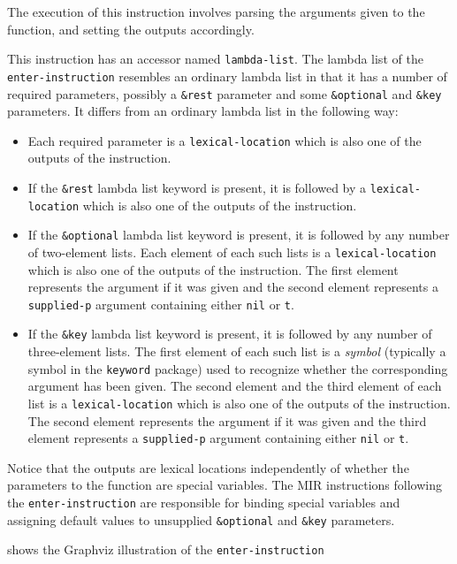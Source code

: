 The execution of this instruction involves parsing the arguments given
to the function, and setting the outputs accordingly.  

This instruction has an accessor named \texttt{lambda-list}.  The
lambda list of the \texttt{enter-instruction} resembles an ordinary
lambda list in that it has a number of required parameters, possibly a
\texttt{\&rest} parameter and some \texttt{\&optional} and
\texttt{\&key} parameters.  It differs from an ordinary lambda list in
the following way:

\begin{itemize}
\item Each required parameter is a \texttt{lexical-location} which is
  also one of the outputs of the instruction.
\item If the \texttt{\&rest} lambda list keyword is present, it is
  followed by a \texttt{lexical-location} which is also one of the
  outputs of the instruction.
\item If the \texttt{\&optional} lambda list keyword is present, it is
  followed by any number of two-element lists.  Each element of each
  such lists is a \texttt{lexical-location} which is also one of the
  outputs of the instruction.  The first element represents the
  argument if it was given and the second element represents a
  \texttt{supplied-p} argument containing either \texttt{nil} or
  \texttt{t}.
\item If the \texttt{\&key} lambda list keyword is present, it is
  followed by any number of three-element lists.  The first element of
  each such list is a \emph{symbol} (typically a symbol in the
  \texttt{keyword} package) used to recognize whether the
  corresponding argument has been given.  The second element and the
  third element of each list is a \texttt{lexical-location} which is
  also one of the outputs of the instruction.  The second element
  represents the argument if it was given and the third element
  represents a \texttt{supplied-p} argument containing either
  \texttt{nil} or \texttt{t}.
\end{itemize}

Notice that the outputs are lexical locations independently of whether
the parameters to the function are special variables.  The MIR
instructions following the \texttt{enter-instruction} are responsible
for binding special variables and assigning default values to
unsupplied \texttt{\&optional} and \texttt{\&key} parameters.

 shows the Graphviz illustration of the
\texttt{enter-instruction}

